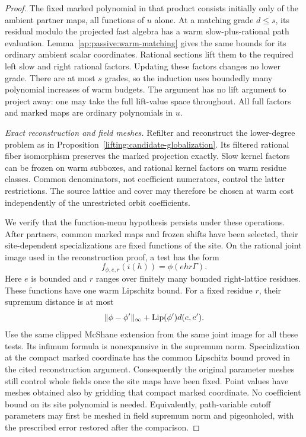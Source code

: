 \begin{proof}
The fixed marked polynomial in that product consists initially
only of the ambient partner maps, all functions of $u$ alone.
At a matching grade $d\leq s$, its residual modulo the projected
fast algebra has a warm slow-plus-rational path evaluation.
Lemma~\ref{ap:passive:warm-matching} gives the same bounds for its
ordinary ambient scalar coordinates.  Rational sections lift them
to the required left slow and right rational factors.  Updating
these factors changes no lower grade.  There are at most $s$
grades, so the induction uses boundedly many polynomial increases
of warm budgets.  The argument has no lift argument to project
away: one may take the full lift-value space throughout.  All full
factors and marked maps are ordinary polynomials in $u$.

\emph{Exact reconstruction and field meshes.}
Refilter and reconstruct the lower-degree problem as in
Proposition~\ref{lifting:candidate-globalization}.  Its filtered
rational fiber isomorphism preserves the marked projection
exactly.  Slow kernel factors can be frozen on warm subboxes, and
rational kernel factors on warm residue classes.  Common
denominators, not coefficient numerators, control the latter
restrictions.  The source lattice and cover may therefore be
chosen at warm cost independently of the unrestricted orbit
coefficients.

We verify that the function-menu hypothesis persists under these
operations.  After partners, common marked maps and frozen shifts
have been selected, their site-dependent specializations are fixed
functions of the site.  On the rational joint image used in the
reconstruction proof, a test has the form
\[
             f_{\phi,e,r}(i(h))=\phi(ehr\Gamma).
\]
Here $e$ is bounded and $r$ ranges over finitely many bounded
right-lattice residues.  These functions have one warm Lipschitz
bound.  For a fixed residue $r$, their supremum distance is at most
\[
 \|\phi-\phi'\|_\infty+
            \operatorname{Lip}(\phi')d(e,e').
\]
Use the same clipped McShane extension from the same joint image
for all these tests.  Its infimum formula is nonexpansive in the
supremum norm.  Specialization at the compact marked coordinate
has the common Lipschitz bound proved in the cited reconstruction
argument.  Consequently the original parameter meshes still
control whole fields once the site maps have been fixed.  Point
values have meshes obtained also by gridding that compact marked
coordinate.  No coefficient bound on its site polynomial is
needed.  Equivalently, path-variable cutoff parameters may first
be meshed in field supremum norm and pigeonholed, with the
prescribed error restored after the comparison.


\end{proof}
